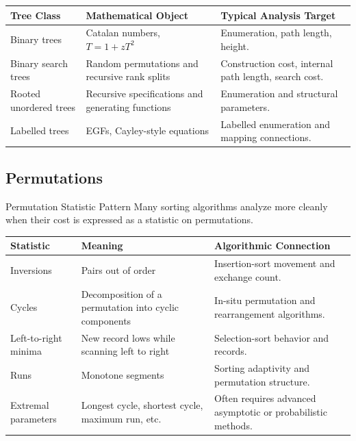 \documentclass[11pt]{article}
\begin{document}
\begin{center}
\begin{tabularx}{\textwidth}{L{0.22\textwidth} L{0.32\textwidth} Y}
\toprule
\textbf{Tree Class} & \textbf{Mathematical Object} & \textbf{Typical Analysis Target} \\
\midrule
Binary trees & Catalan numbers, \(T=1+zT^2\) & Enumeration, path length, height. \\
Binary search trees & Random permutations and recursive rank splits & Construction cost, internal path length, search cost. \\
Rooted unordered trees & Recursive specifications and generating functions & Enumeration and structural parameters. \\
Labelled trees & EGFs, Cayley-style equations & Labelled enumeration and mapping connections. \\
\bottomrule
\end{tabularx}
\end{center}

\subsection{Permutations}

\begin{patternbox}{Permutation Statistic Pattern}
Many sorting algorithms analyze more cleanly when their cost is expressed as a statistic on permutations.
\end{patternbox}

\begin{center}
\begin{tabularx}{\textwidth}{L{0.24\textwidth} L{0.30\textwidth} Y}
\toprule
\textbf{Statistic} & \textbf{Meaning} & \textbf{Algorithmic Connection} \\
\midrule
Inversions & Pairs out of order & Insertion-sort movement and exchange count. \\
Cycles & Decomposition of a permutation into cyclic components & In-situ permutation and rearrangement algorithms. \\
Left-to-right minima & New record lows while scanning left to right & Selection-sort behavior and records. \\
Runs & Monotone segments & Sorting adaptivity and permutation structure. \\
Extremal parameters & Longest cycle, shortest cycle, maximum run, etc. & Often requires advanced asymptotic or probabilistic methods. \\
\bottomrule
\end{tabularx}
\end{center}
\end{document}
